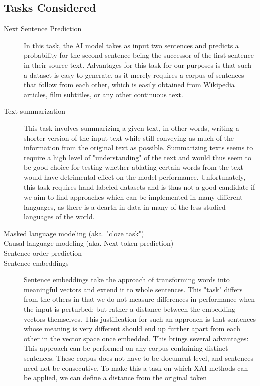 \subsection{Tasks Considered}
\begin{description}
	\item[Next Sentence Prediction]
	      In this task, the AI model takes as input two sentences and predicts a probability for the second sentence being the successor of the first sentence in their source text.
	      Advantages for this task for our purposes is that such a dataset is easy to generate, as it merely requires a corpus of sentences that follow from each other, which is easily obtained from Wikipedia articles, film subtitles, or any other continuous text.

	\item[Text summarization]
	      This task involves summarizing a given text, in other words, writing a shorter version of the input text while still conveying as much of the information from the original text as possible.
	      Summarizing texts seems to require a high level of "understanding" of the text and would thus seem to be good choice for testing whether ablating certain words from the text would have detrimental effect on the model performance.
	      Unfortunately, this task requires hand-labeled datasets and is thus not a good candidate if we aim to find approaches which can be implemented in many different languages, as there is a dearth in data in many of the less-studied languages of the world.

	\item[Masked language modeling (aka. "cloze task")]
	\item[Causal language modeling (aka. Next token prediction)]
	\item[Sentence order prediction]
	\item[Sentence embeddings]
	      Sentence embeddings take the approach of transforming words into meaningful vectors and extend it to whole sentences.
	      This "task" differs from the others in that we do not measure differences in performance when the input is perturbed; but rather a distance between the embedding vectors themselves.
	      This justification for such an approach is that sentences whose meaning is very different should end up further apart from each other in the vector space once embedded.
	      This brings several advantages:
	      This approach can be performed on any corpus containing distinct sentences.
	      These corpus does not have to be document-level, and sentences need not be consecutive.
	      To make this a task on which XAI methods can be applied, we can define a distance from the original token
\end{description}

